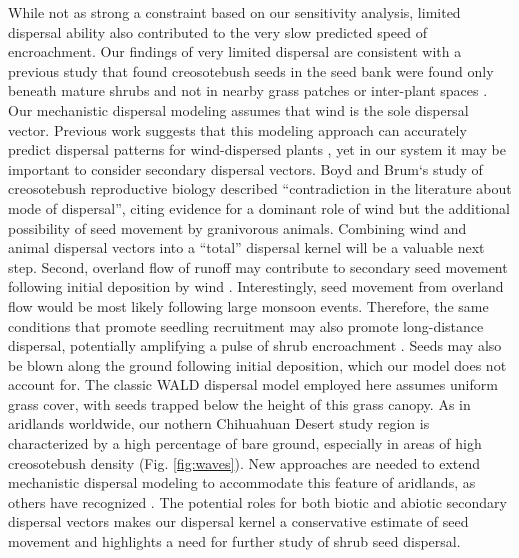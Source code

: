 \documentclass[11pt]{article}\usepackage[]{graphicx}\usepackage[usenames,dvipsnames]{xcolor}
\begin{document}
While not as strong a constraint based on our sensitivity analysis, limited dispersal ability also contributed to the very slow predicted speed of encroachment. 
Our findings of very limited dispersal are consistent with a previous study that found creosotebush seeds in the seed bank were found only beneath mature shrubs and not in nearby grass patches or inter-plant spaces \citep{moreno2016seed}. 
Our mechanistic dispersal modeling assumes that wind is the sole dispersal vector. 
Previous work suggests that this modeling approach can accurately predict dispersal patterns for wind-dispersed plants \citep{skarpaas2007dispersal}, yet in our system it may be important to consider secondary dispersal vectors. 
Boyd and Brum`s \citeyear{boyd1983postdispersal} study of creosotebush reproductive biology described ``contradiction in the literature about mode of dispersal'', citing evidence for a dominant role of wind but the additional possibility of seed movement by granivorous animals. 
Combining wind and animal dispersal vectors into a ``total'' dispersal kernel \citep{rogers2019total} will be a valuable next step. 
Second, overland flow of runoff may contribute to secondary seed movement following initial deposition by wind \citep{thompson2014secondary}. 
Interestingly, seed movement from overland flow would be most likely following large monsoon events. 
Therefore, the same conditions that promote seedling recruitment may also promote long-distance dispersal, potentially amplifying a pulse of shrub encroachment \citep{ellner2012temporally}. 
Seeds may also be blown along the ground following initial deposition, which our model does not account for.
The classic WALD dispersal model employed here assumes uniform grass cover, with seeds trapped below the height of this grass canopy. 
As in aridlands worldwide, our nothern Chihuahuan Desert study region is characterized by a high percentage of bare ground, especially in areas of high creosotebush density (Fig. \ref{fig:waves}). 
New approaches are needed to extend mechanistic dispersal modeling to accommodate this feature of aridlands, as others have recognized \citep{thompson2014secondary}. 
The potential roles for both biotic and abiotic secondary dispersal vectors makes our dispersal kernel a conservative estimate of seed movement and highlights a need for further study of shrub seed dispersal. 
\end{document}
